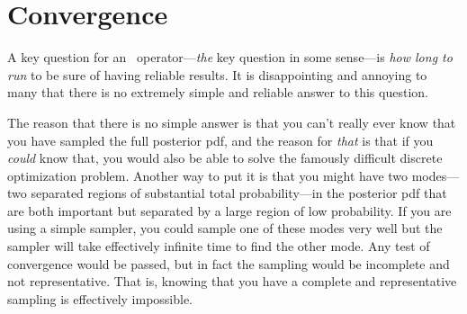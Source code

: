 \documentclass[modern]{aastex61}
\newcommand{\MCMC}{\acronym{MCMC}}
\begin{document}
\section{Convergence}\label{sec:convergence}

A key question for an \MCMC\ operator---\emph{the} key question in some
sense---is \emph{how long to run} to be sure of having reliable
results.
It is disappointing and annoying to many that there is no extremely
simple and reliable answer to this question.

The reason that there is no simple answer is that you can't really
ever know that you have sampled the full posterior pdf, and the reason
for \emph{that} is that if you \emph{could} know that, you would also
be able to solve the famously difficult discrete optimization
problem.
Another way to put it is that you might have two modes---two separated
regions of substantial total probability---in the posterior pdf that
are both important but separated by a large region of low probability.
If you are using a simple sampler, you could sample one of these modes
very well but the sampler will take effectively infinite time to find
the other mode.
Any test of convergence would be passed, but in fact the sampling
would be incomplete and not representative.
That is, knowing that you have a complete and representative sampling
is effectively impossible.
\end{document}
